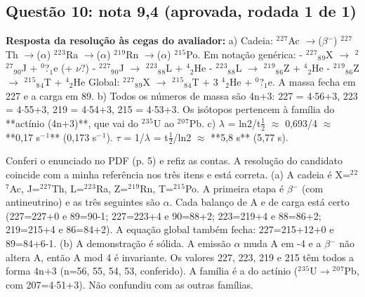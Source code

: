 \documentclass{article}%
\begin{document}
\subsection*{Questão 10: nota 9,4 (aprovada, rodada 1 de 1)}%
\textbf{Resposta da resolução às cegas do avaliador:} a) Cadeia: $^2$$^2$$^{7}$Ac $\to$($\beta$$^{-}$) $^2$$^2$$^{7}$Th $\to$($\alpha$) $^2$$^2$$^3$Ra $\to$($\alpha$) $^2$$^{1}$$^{9}$Rn $\to$($\alpha$) $^2$$^{1}$$^{5}$Po. Em notação genérica:\newline%
{-} $^2$$^2$$^{7}$$_{8}$$_{9}$X $\to$ $^2$$^2$$^{7}$$_{9}$$_{0}$J + $^{0}$?$_{1}$e (+ $\nu$?)\newline%
{-} $^2$$^2$$^{7}$$_{9}$$_{0}$J $\to$ $^2$$^2$$^3$$_{8}$$_{8}$L + $^{4}$$_{2}$He\newline%
{-} $^2$$^2$$^3$$_{8}$$_{8}$L $\to$ $^2$$^{1}$$^{9}$$_{8}$$_{6}$Z + $^{4}$$_{2}$He\newline%
{-} $^2$$^{1}$$^{9}$$_{8}$$_{6}$Z $\to$ $^2$$^{1}$$^{5}$$_{8}$$_{4}$T + $^{4}$$_{2}$He\newline%
Global: $^2$$^2$$^{7}$$_{8}$$_{9}$X $\to$ $^2$$^{1}$$^{5}$$_{8}$$_{4}$T + 3 $^{4}$$_{2}$He + $^{0}$?$_{1}$e. A massa fecha em 227 e a carga em 89.\newline%
\newline%
b) Todos os números de massa são 4n+3: 227 = 4$\cdot$56+3, 223 = 4$\cdot$55+3, 219 = 4$\cdot$54+3, 215 = 4$\cdot$53+3. Os isótopos pertencem à família do **actínio (4n+3)**, que vai do $^2$$^3$$^{5}$U ao $^2$$^{0}$$^{7}$Pb.\newline%
\newline%
c) $\lambda$ = ln2/t$\frac12$ $\approx$ 0,693/4 $\approx$ **0,17 s$^{-}$$^{1}$** (0,173 s$^{-}$$^{1}$). $\tau$ = 1/$\lambda$ = t$\frac12$/ln2 $\approx$ **5,8 s** (5,77 s).\par %
Conferi o enunciado no PDF (p. 5) e refiz as contas. A resolução do candidato coincide com a minha referência nos três itens e está correta.\newline%
\newline%
(a) A cadeia é X=$^2$$^2$$^{7}$Ac, J=$^2$$^2$$^{7}$Th, L=$^2$$^2$$^3$Ra, Z=$^2$$^{1}$$^{9}$Rn, T=$^2$$^{1}$$^{5}$Po. A primeira etapa é $\beta$$^{-}$ (com antineutrino) e as três seguintes são $\alpha$. Cada balanço de A e de carga está certo (227=227+0 e 89=90-1; 227=223+4 e 90=88+2; 223=219+4 e 88=86+2; 219=215+4 e 86=84+2). A equação global também fecha: 227=215+12+0 e 89=84+6-1.\newline%
\newline%
(b) A demonstração é sólida. A emissão $\alpha$ muda A em -4 e a $\beta$$^{-}$ não altera A, então A mod 4 é invariante. Os valores 227, 223, 219 e 215 têm todos a forma 4n+3 (n=56, 55, 54, 53, conferido). A família é a do actínio ($^2$$^3$$^{5}$U$\to$$^2$$^{0}$$^{7}$Pb, com 207=4$\cdot$51+3). Não confundiu com as outras famílias.\newline%
\end{document}

